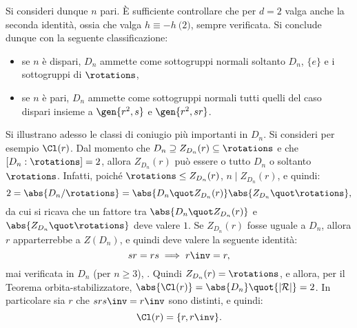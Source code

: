 \documentclass[12pt]{scrartcl}
\begin{document}
	
	Si consideri dunque $n$ pari. È sufficiente controllare che per $d = 2$ valga
	anche la seconda identità, ossia che valga $h \equiv -h \pod 2$, sempre verificata.
	Si conclude dunque con la seguente classificazione:
	
	\begin{itemize}
		\item se $n$ è dispari, $D_n$ ammette come sottogruppi normali soltanto
		$D_n$, $\{ e \}$ e i sottogruppi di $\rotations$,
		\item se $n$ è pari, $D_n$ ammette come sottogruppi normali tutti quelli
			del caso dispari insieme a $\gen{r^2, s}$ e $\gen{r^2, s r}$.
	\end{itemize}
	
	
	Si illustrano adesso le classi di coniugio più importanti in $D_n$. Si consideri
	per esempio $\Cl(r)$. Dal momento che $D_n \supseteq Z_{D_n}(r) \subseteq \rotations$
	e che $[D_n : \rotations] = 2$, allora $Z_{D_n}(r)$ può essere o tutto $D_n$ o
	soltanto $\rotations$. Infatti, poiché $\rotations \leq Z_{D_n}(r)$,
	$n \mid Z_{D_n}(r)$, e quindi:
	\[ 2 = \abs{D_n/\rotations} = \abs{D_n \quot Z_{D_n}(r)} \abs{Z_{D_n} \quot \rotations}, \]
	da cui si ricava che un fattore tra $\abs{D_n \quot Z_{D_n}(r)}$ e
	$\abs{Z_{D_n} \quot \rotations}$ deve valere $1$. Se $Z_{D_n}(r)$ fosse uguale a
	$D_n$, allora $r$ apparterrebbe a $Z(D_n)$, e quindi deve valere la seguente identità:
	\[ sr = rs \implies r\inv = r, \]
	mai verificata in $D_n$ (per $n \geq 3$), \Lightning. Quindi $Z_{D_n}(r) = \rotations$,
	e allora, per il Teorema orbita-stabilizzatore, $\abs{\Cl(r)} = \abs{D_n} \quot {\left\lvert \mathcal{R} \right\rvert} = 2$. In particolare sia $r$ che $s r s\inv = r\inv$ sono distinti,
	e quindi:
	\[ \Cl(r) = \{r, r\inv\}. \]
\end{document}
